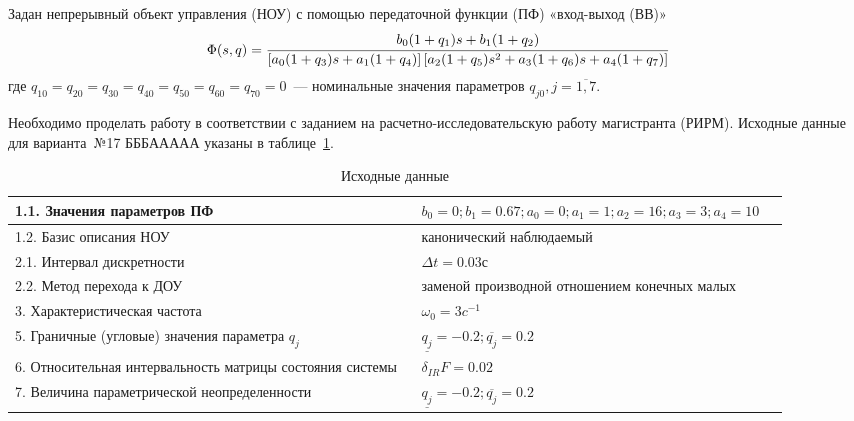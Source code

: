 
Задан непрерывный объект управления (НОУ) с помощью передаточной функции (ПФ) «вход-выход (ВВ)»
\begin{equation}\label{eq_pf0}
	\Phi (s, q) = \cfrac{b_0 (1 + q_1) s + b_1 (1 + q_2)}{\left[a_0 (1+q_3)s + a_1 (1+q_4)\right]\left[a_2 (1+q_5) s^2 + a_3 (1 + q_6) s + a_4 (1 + q_7)\right]}
\end{equation}
где $q_{10}=q_{20}=q_{30}=q_{40}=q_{50}=q_{60}=q_{70}=0$~--- номинальные значения параметров $q_{j0}, j = \overline{1,7}$.

Необходимо проделать работу в соответствии с заданием на расчетно-исследовательскую  работу магистранта (РИРМ). Исходные данные для варианта~№17 БББААААА указаны в таблице~\ref{problem_data}.


	\begin{table}[h!]
	\caption{Исходные данные}
	\begin{tabular}{|p{0.5\linewidth}|p{0.4\linewidth}|}
\hline
1.1. Значения параметров ПФ & 
$b_0 = 0; b_1 = 0.67; a_0=0; a_1 = 1; a_2 = 16; a_3 = 3; a_4 = 10$
\\
\hline
1.2. Базис описания НОУ & канонический наблюдаемый
\\
\hline
2.1. Интервал дискретности & $\Delta{t} = 0.03$с\\
\hline
2.2. Метод перехода к ДОУ & заменой производной отношением конечных малых
\\
\hline
3. Характеристическая частота  & $\omega_0 = 3 c^{-1}$\\
\hline
5. Граничные (угловые) значения параметра $q_j$  & $\underline{q_j} = -0.2; \overline{q_j} = 0.2$ \\ 
\hline
6. Относительная интервальность матрицы состояния системы & $\delta_{IR} F = 0.02$\\
\hline
7. Величина параметрической неопределенности  & $\underline{q_j} = -0.2; \overline{q_j} = 0.2$\\
\hline
	\end{tabular}
	\label{problem_data}
\end{table}



\newpage